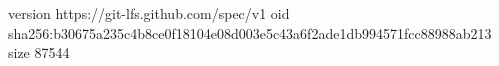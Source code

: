 version https://git-lfs.github.com/spec/v1
oid sha256:b30675a235c4b8ce0f18104e08d003e5c43a6f2ade1db994571fcc88988ab213
size 87544
